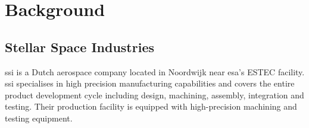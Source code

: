 \section{Background}




\subsection*{Stellar Space Industries}
\gls{ssi} is a Dutch aerospace company located in Noordwijk near \gls{esa}'s ESTEC facility.
\gls{ssi} specialises in high precision manufacturing capabilities
and covers the entire product development cycle including design, machining, assembly, integration and testing.
Their production facility is equipped with high-precision machining and testing equipment.

